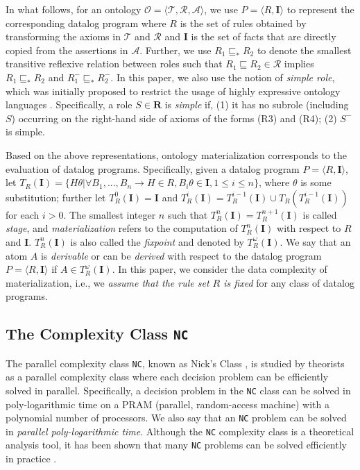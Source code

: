 In what follows, for an ontology $\mathcal{O}=\langle\mathcal{T},\mathcal{R},\mathcal{A}\rangle$,
we use $P=\langle R, \textbf{I}\rangle$ to represent the corresponding datalog program
where $R$ is the set of rules obtained by transforming the axioms in
$\mathcal{T}$ and $\mathcal{R}$ and
$\textbf{I}$ is the set of facts that are directly copied from the assertions in $\mathcal{A}$.
Further, we use $R_1\sqsubseteq_{*}R_2$ to denote the smallest transitive reflexive relation
between roles such that $R_1\sqsubseteq R_2\in\mathcal{R}$ implies $R_1\sqsubseteq_{*}R_2$
and $R_1^-\sqsubseteq_{*}R_2^-$. In this paper, we also use the
notion of \emph{simple role}, which was initially proposed to restrict the
usage of highly expressive ontology languages \cite{HorrocksS04}.
Specifically, a role $S\in\textbf{R}$ is \emph{simple} if, (1) it has no subrole (including $S$)
occurring on the right-hand side of axioms of the forms (R3) and (R4); (2) $S^-$ is simple.

Based on the above representations, ontology materialization
corresponds to the evaluation of datalog programs.
Specifically, given a datalog program $P=\langle R, \textbf{I}\rangle$,
let $T_R(\textbf{I})=\{H\theta|\forall B_1,...,B_n\rightarrow H\in R,
B_i\theta\in\textbf{I}, 1\leq i\leq n \}$,
where $\theta$ is some substitution; further let $T_R^{0}(\textbf{I})=\textbf{I}$ and
 $T_R^{i}(\textbf{I})=T_R^{i-1}(\textbf{I})\cup T_R(T_R^{i-1}(\textbf{I}))$ for each $i>0$.
The smallest integer $n$ such that $T_R^{n}(\textbf{I})= T_R^{n+1}(\textbf{I})$ is called \emph{stage},
and \emph{materialization} refers to the computation of $T_R^{n}(\textbf{I})$ with respect to $R$ and \textbf{I}.
$T_R^{n}(\textbf{I})$ is also called the \emph{fixpoint} and denoted by $T_R^{\omega}(\textbf{I})$.
We say that an atom $A$ is \emph{derivable} or can be \emph{derived} with respect
to the datalog program $P=\langle R, \textbf{I}\rangle$ if $A\in T_R^{\omega}(\textbf{I})$.
In this paper, we consider the data complexity of materialization, i.e., we \emph{assume that the rule set $R$ is fixed}
for any class of datalog programs.


\subsection{The Complexity Class \texttt{NC}}

The parallel complexity class \texttt{NC}, known as Nick's
Class \cite{Raymond95}, is studied by theorists as a parallel complexity class
where each decision problem can be efficiently solved in parallel.
Specifically, a decision problem in the \texttt{NC} class
can be solved in poly-logarithmic time on a PRAM (parallel, random-access machine) with
a polynomial number of processors. We also say that an \texttt{NC} problem can be solved
in \emph{parallel poly-logarithmic time}.
Although the \texttt{NC} complexity class is a theoretical analysis tool,
it has been shown that many \texttt{NC} problems can be solved efficiently in practice \cite{Raymond95}.

